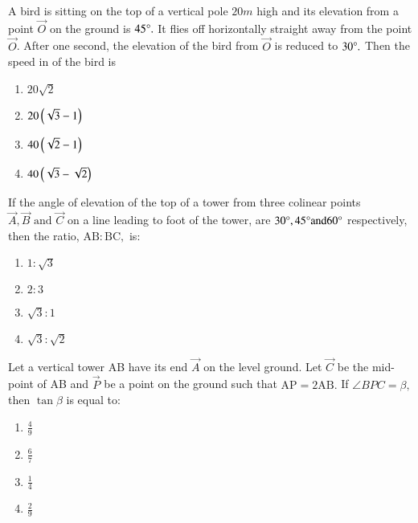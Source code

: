 \item A bird is sitting on the top of a vertical pole $20m$ high and its elevation from a point $\vec{O}$ on the  ground is $45\degree.$ It flies off horizontally straight away from the point $\vec{O}$. After one second, the elevation of the bird from $\vec{O}$ is reduced to $30\degree.$ Then the speed in  of the bird is \hfill{}
\begin{multicols}{4}
\begin{enumerate}
        \item $20\sqrt{2}$                    
        \item $20\left(\sqrt{3}-1\right)$ 
        \item $40\left(\sqrt{2}-1\right)$ 
        \item $40\left(\sqrt{3}-\sqrt{2}\right)$
\end{enumerate}
\end{multicols} 

\item If the angle of elevation of the top of a tower from three colinear points $\vec{A},\vec{B}\text{ and }\vec{C}$ on a line leading to foot of the tower, are $30\degree,45\degree \text{and}  60\degree$ respectively, then the ratio, $\text{AB}:\text{BC},$ is: 
\hfill{}
\begin{multicols}{4}
\begin{enumerate}
        \item $1:\sqrt{3}$                    
        \item $2:3$ 
        \item $\sqrt{3}:1$ 
        \item $\sqrt{3}:\sqrt{2}$
\end{enumerate}
\end{multicols} 

\item Let a vertical tower AB have its end $\vec{A}$ on the level ground. Let $\vec{C}$ be the  mid-point of AB and $\vec{P}$ be a point on the ground such that $\text{AP}=2\text{AB}.$ If $\angle{BPC}=\beta,$ then $\tan \beta$ is equal to: \hfill{}
\begin{multicols}{4}
\begin{enumerate}
        \item $\frac{4}{9}$                    
        \item $\frac{6}{7}$ 
        \item $\frac{1}{4}$ 
        \item $\frac{2}{9}$
\end{enumerate}
\end{multicols} 


